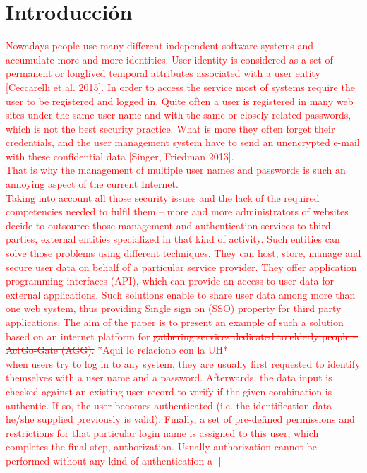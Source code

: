 \chapter*{Introducción}\label{chapter:introduction}
\textcolor{red}{Nowadays people use many different independent software systems and accumulate
	more and more identities. User identity is considered as a set of permanent or longlived temporal attributes associated with a user entity [Ceccarelli et al. 2015]. In order
	to access the service most of systems require the user to be registered and logged
	in. Quite often a user is registered in many web sites under the same user name and
	with the same or closely related passwords, which is not the best security practice.
	What is more they often forget their credentials, and the user management system
	have to send an unencrypted e-mail with these confidential data [Singer, Friedman
	2013]. \\ 
	That is why the management of multiple user names and passwords is such an
	annoying aspect of the current Internet.\\
	Taking into account all those security issues and the lack of the required
	competencies needed to fulfil them – more and more administrators of websites
	decide to outsource those management and authentication services to third parties,
	external entities specialized in that kind of activity. Such entities can solve those
	problems using different techniques. They can host, store, manage and secure user data on behalf of a particular service provider. They offer application programming
	interfaces (API), which can provide an access to user data for external applications.
	Such solutions enable to share user data among more than one web system, thus
	providing Single sign on (SSO) property for third party applications. The aim of the
	paper is to present an example of such a solution based on an internet platform for
	\sout{ gathering services dedicated to elderly people – ActGo-Gate (AGG).} *Aqui lo relaciono con la UH* \\
	when users try to log in to any system, they are usually first
	requested to identify themselves with a user name and a password. Afterwards, the
	data input is checked against an existing user record to verify if the given combination
	is authentic. If so, the user becomes authenticated (i.e. the identification data he/she
	supplied previously is valid). Finally, a set of pre-defined permissions and restrictions
	for that particular login name is assigned to this user, which completes the final step,
	authorization. Usually authorization cannot be performed without any kind of authentication a} [\cite{kutera2016single}]

